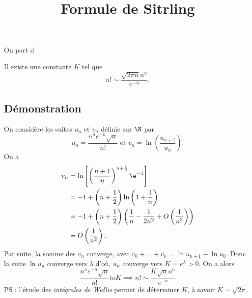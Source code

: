 \documentclass[fontsize=12pt,twoside=false,parskip=half,french]{scrartcl}
\title{Formule de Sitrling}
\date{}
\author{}
\begin{document}
On part d
\maketitle
   \begin{Theoreme}
      Il existe une constante $K$ tel que
      \[
        n! \sim \frac{\sqrt{2\pi n} n^n}{e^{-n}}.
      \]
   \end{Theoreme}
   \subsection{Démonstration}
      On considère les suites $u_n$ et $v_n$ définie sur $\N$ par
      \[
        u_n = \frac{n^ne^{-n}\sqrt{n}}{n!} \text{ et }
        v_n = \ln \left(\frac{u_{n + 1}}{u_n}\right).
      \]
      On a
      \begin{align*}
        v_n &= \ln \left[ \left(\frac{n + 1}{n}\right)^{n + \frac{1}{2}} \e^{-1}\right] \\
            &= -1 + \left( n + \frac{1}{2}\right) \ln \left(1 + \frac{1}{n}\right)\\
            &= -1 + \left( n + \frac{1}{2}\right) \left(\frac{1}{n} - \frac{1}{2n^2} + O\left(\frac{1}{n^3}\right)\right) \\
            &= O\left(\frac{1}{n^2}\right).
      \end{align*}
      Par suite, la somme des $v_n$ converge, avec $v_0 + \ldots + v_n = \ln u_{n + 1} - \ln u_0$.
      Donc la suite $\ln u_n$ converge vers $\lambda$ d'où, $u_n$ converge vers $K = e^\lambda > 0$.
      On a alors
      \[
        \frac{n^ne^{-n}\sqrt{n}}{n!} to K \implies
        n! \sim \frac{K \sqrt{n} n^n}{e^{-n}}
      \]
      PS : l'étude des \emph{intégrales de Wallis} permet de déterminer $K$, à
           savoir $K = \sqrt{2\pi}$.
\end{document}
